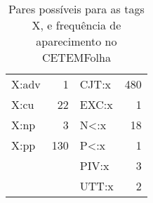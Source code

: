 \begin{table}[!h]
    \centering
    \begin{tabular}{|l|r|l|r|}
    \hline
        X:adv   &   1   &   CJT:x   &   480\\
        X:cu    &   22  &   EXC:x   &   1\\
        X:np    &   3   &   N<:x    &   18\\
        X:pp    &   130 &   P<:x    &   1\\
        	    &       &   PIV:x   &   3\\
        	    &	    &   UTT:x   &   2\\
        \hline
    \end{tabular}
    \caption{Pares possíveis para as tags X, e frequência de aparecimento no CETEMFolha}
    \label{tab:tag_X}
\end{table}